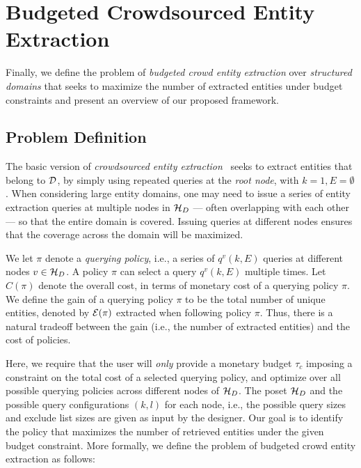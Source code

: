 \section{Budgeted Crowdsourced Entity Extraction}
\label{sec:problem}
Finally, we define the problem of {\em budgeted crowd entity extraction} over {\em structured domains} that seeks to maximize the number of extracted entities under budget constraints and present an overview of our proposed framework.
\subsection{Problem Definition}
\label{sec:extraction}
The basic version of {\em crowdsourced entity extraction}~\cite{trushkowsky:2013} seeks to extract entities that belong to $\mathcal{D}$, by simply using repeated queries at the {\em root node}, with $k = 1, E = \emptyset$. When considering large entity domains, one may need to issue a series of entity extraction queries at multiple nodes in  $\mathcal{H}_D$ --- often overlapping with each other --- so that the entire domain is covered. Issuing queries at different nodes ensures that the coverage across the domain will be maximized. 

We let $\pi$ denote a {\em querying policy}, i.e., a series of $q^v(k,E)$ queries at different nodes $v \in \mathcal{H}_D$. A policy $\pi$ can select a query $q^v(k,E)$ multiple times. Let $C(\pi)$ denote the overall cost, in terms of monetary cost of a querying policy $\pi$. We define the gain of a querying policy $\pi$ to be the total number of unique entities, denoted by $\mathcal{E}(\pi)$ extracted when following policy $\pi$. Thus, there is a natural tradeoff between the gain (i.e., the number of extracted entities) and the cost of policies. 

Here, we require that the user will {\em only} provide a monetary budget $\tau_c$ imposing a constraint on the total cost of a selected querying policy, and optimize over all possible querying policies across different nodes of $\mathcal{H}_D$. The poset $\mathcal{H}_D$ and the possible query configurations $(k,l)$ for each node, i.e., the possible query sizes and exclude list sizes are given as input by the designer. Our goal is to identify the policy that maximizes the number of retrieved entities under the given budget constraint. More formally, we define the problem of budgeted crowd entity extraction as follows:

